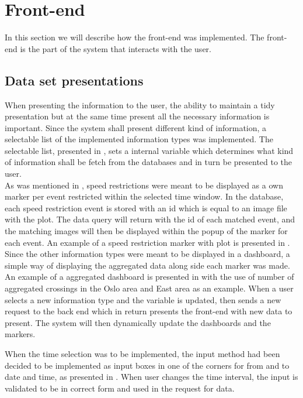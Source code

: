 
\section{Front-end} %
\label{sec:front_end}
In this section we will describe how the front-end was implemented. The
front-end is the part of the system that interacts with the user.

\subsection{Data set presentations} %
\label{sub:front_end_data_set_presentation}
When presenting the information to the user, the ability to maintain a tidy
presentation but at the same time present all the necessary information is 
important. Since the system shall present different kind of information, a 
selectable list of the implemented information types was implemented. The 
selectable list, presented in , sets a 
internal variable which determines what kind of information shall be fetch 
from the databases and in turn be presented to the user.\\

As was mentioned in , speed restrictions were
meant to be displayed as a own marker per event restricted within the selected
time window. In the database, each speed restriction event is stored with an id
which is equal to an image file with the plot. The data query will return with 
the id of each matched event, and the matching images will then be displayed
within the popup of the marker for each event. An example of a speed 
restriction marker with plot is presented in .\\


Since the other information types were meant to be displayed in a dashboard, a
simple way of displaying the aggregated data along side each marker was made.
An example of a aggregated dashboard is presented in  with the use of number of aggregated crossings in the Oslo area and East area as an example. When a user selects a new information type and the variable is updated, then sends a new request to the back end which in return presents the front-end with new data to present. The system will then dynamically update the dashboards and the markers.

When the time selection was to be implemented, the input method had been
decided to be implemented as input boxes in one of the corners for from and to 
date and time, as presented in . When user 
changes the time interval, the input is validated to be in correct form and 
used in the request for data.\\

